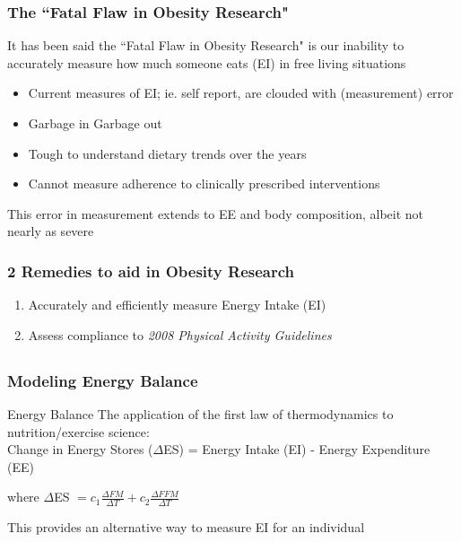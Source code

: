 \documentclass[handout]{beamer}\usepackage[]{graphicx}\usepackage[]{color}
\begin{document}
\begin{frame}
\frametitle{The ``Fatal Flaw in Obesity Research"}
It has been said the ``Fatal Flaw in Obesity Research" is our inability to accurately measure how much someone eats (EI) in free living situations

\begin{itemize}
\item
Current measures of EI; ie. self report, are clouded with (measurement) error \\
\item
Garbage in Garbage out \\
\item
Tough to understand dietary trends over the years \\
\item
Cannot measure adherence to clinically prescribed interventions \\
\end{itemize}

This error in measurement extends to EE and body composition, albeit not nearly as severe

\end{frame}


\begin{frame}
\frametitle{2 Remedies to aid in Obesity Research}
\begin{enumerate}
\item
Accurately and efficiently measure Energy Intake (EI)

\vspace{0.2cm}

\item
Assess compliance to \emph{2008 Physical Activity Guidelines}
\end{enumerate}



\end{frame}

\subsection{}

\begin{frame}
\frametitle{Modeling Energy Balance}

\begin{block}{Energy Balance}
The application of the first law of thermodynamics to nutrition/exercise science: \\
Change in Energy Stores ($\Delta$ES) = Energy Intake (EI) - Energy Expenditure (EE)
\end{block}

where $\Delta$ES $= c_1 \frac{\Delta FM}{\Delta T } + c_2 \frac{\Delta FFM}{\Delta T}$  

\vspace{0.4cm}

This provides an alternative way to measure EI for an individual


\end{frame}
\end{document}
